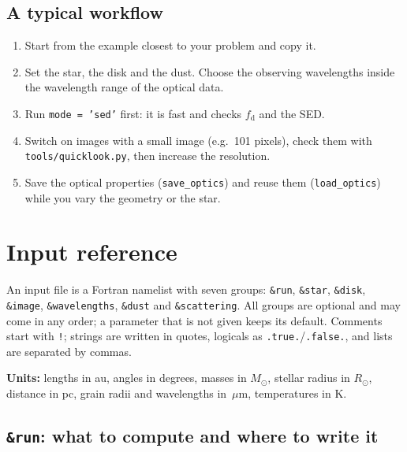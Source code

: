 \documentclass[11pt,a4paper]{article}
\newcommand{\code}[1]{\texttt{#1}}
\newcommand{\um}{\,$\mu$m}
\newcommand{\Msun}{M_\odot}
\begin{document}
\subsection{A typical workflow}

\begin{enumerate}
\item Start from the example closest to your problem and copy it.
\item Set the star, the disk and the dust. Choose the observing wavelengths inside the wavelength
      range of the optical data.
\item Run \code{mode = 'sed'} first: it is fast and checks $f_\mathrm{d}$ and the SED.
\item Switch on images with a small image (e.g.\ 101 pixels), check them with
      \code{tools/quicklook.py}, then increase the resolution.
\item Save the optical properties (\code{save\_optics}) and reuse them
      (\code{load\_optics}) while you vary the geometry or the star.
\end{enumerate}

\section{Input reference}
\label{sec:input}

An input file is a Fortran namelist with seven groups: \code{\&run}, \code{\&star}, \code{\&disk},
\code{\&image}, \code{\&wavelengths}, \code{\&dust} and \code{\&scattering}. All groups are optional
and may come in any order; a parameter that is not given keeps its default. Comments start with
\code{!}; strings are written in quotes, logicals as \code{.true.}/\code{.false.}, and lists are
separated by commas.

\textbf{Units:} lengths in au, angles in degrees, masses in $\Msun$, stellar radius in
$R_\odot$, distance in pc, grain radii and wavelengths in \um, temperatures in K.

\subsection{\code{\&run}: what to compute and where to write it}
\end{document}
